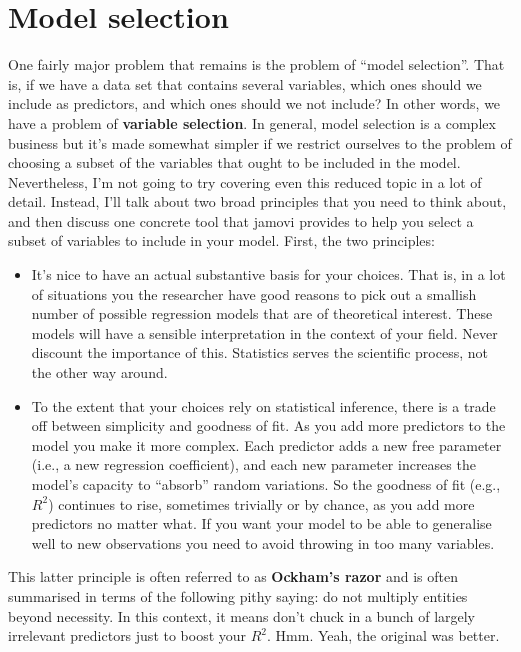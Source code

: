 \documentclass[
  a4paper,
]{book}
\begin{document}
\hypertarget{model-selection}{%
\section{Model selection}\label{model-selection}}

One fairly major problem that remains is the problem of ``model
selection''. That is, if we have a data set that contains several
variables, which ones should we include as predictors, and which ones
should we not include? In other words, we have a problem of
\textbf{variable selection}. In general, model selection is a complex
business but it's made somewhat simpler if we restrict ourselves to the
problem of choosing a subset of the variables that ought to be included
in the model. Nevertheless, I'm not going to try covering even this
reduced topic in a lot of detail. Instead, I'll talk about two broad
principles that you need to think about, and then discuss one concrete
tool that jamovi provides to help you select a subset of variables to
include in your model. First, the two principles:

\begin{itemize}
\item
  It's nice to have an actual substantive basis for your choices. That
  is, in a lot of situations you the researcher have good reasons to
  pick out a smallish number of possible regression models that are of
  theoretical interest. These models will have a sensible interpretation
  in the context of your field. Never discount the importance of this.
  Statistics serves the scientific process, not the other way around.
\item
  To the extent that your choices rely on statistical inference, there
  is a trade off between simplicity and goodness of fit. As you add more
  predictors to the model you make it more complex. Each predictor adds
  a new free parameter (i.e., a new regression coefficient), and each
  new parameter increases the model's capacity to ``absorb'' random
  variations. So the goodness of fit (e.g., \(R^2\)) continues to rise,
  sometimes trivially or by chance, as you add more predictors no matter
  what. If you want your model to be able to generalise well to new
  observations you need to avoid throwing in too many variables.
\end{itemize}

This latter principle is often referred to as \textbf{Ockham's razor}
and is often summarised in terms of the following pithy saying: do not
multiply entities beyond necessity. In this context, it means don't
chuck in a bunch of largely irrelevant predictors just to boost your
\(R^2\). Hmm. Yeah, the original was better.
\end{document}

